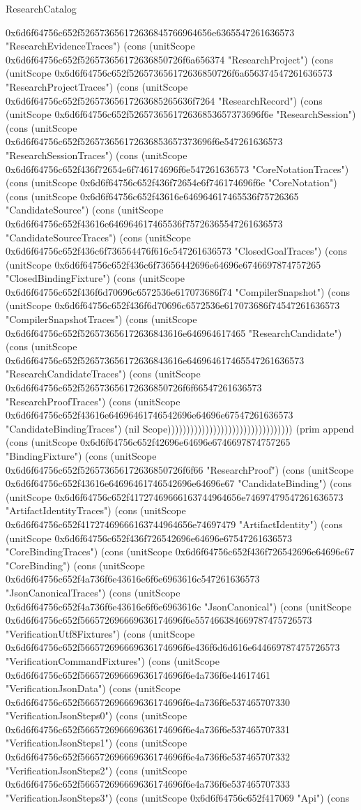 \begin{lexlean}{ResearchCatalog}
\begin{semanticmodule}
{0x6d6f64756c652f526573656172636845766964656e6365547261636573 "ResearchEvidenceTraces") (cons (unitScope 0x6d6f64756c652f526573656172636850726f6a656374 "ResearchProject") (cons (unitScope 0x6d6f64756c652f526573656172636850726f6a656374547261636573 "ResearchProjectTraces") (cons (unitScope 0x6d6f64756c652f52657365617263685265636f7264 "ResearchRecord") (cons (unitScope 0x6d6f64756c652f526573656172636853657373696f6e "ResearchSession") (cons (unitScope 0x6d6f64756c652f526573656172636853657373696f6e547261636573 "ResearchSessionTraces") (cons (unitScope 0x6d6f64756c652f436f72654e6f746174696f6e547261636573 "CoreNotationTraces") (cons (unitScope 0x6d6f64756c652f436f72654e6f746174696f6e "CoreNotation") (cons (unitScope 0x6d6f64756c652f43616e646964617465536f75726365 "CandidateSource") (cons (unitScope 0x6d6f64756c652f43616e646964617465536f75726365547261636573 "CandidateSourceTraces") (cons (unitScope 0x6d6f64756c652f436c6f736564476f616c547261636573 "ClosedGoalTraces") (cons (unitScope 0x6d6f64756c652f436c6f73656442696e64696e6746697874757265 "ClosedBindingFixture") (cons (unitScope 0x6d6f64756c652f436f6d70696c6572536e617073686f74 "CompilerSnapshot") (cons (unitScope 0x6d6f64756c652f436f6d70696c6572536e617073686f74547261636573 "CompilerSnapshotTraces") (cons (unitScope 0x6d6f64756c652f526573656172636843616e646964617465 "ResearchCandidate") (cons (unitScope 0x6d6f64756c652f526573656172636843616e646964617465547261636573 "ResearchCandidateTraces") (cons (unitScope 0x6d6f64756c652f526573656172636850726f6f66547261636573 "ResearchProofTraces") (cons (unitScope 0x6d6f64756c652f43616e64696461746542696e64696e67547261636573 "CandidateBindingTraces") (nil Scope))))))))))))))))))))))))))))))))) (prim append (cons (unitScope 0x6d6f64756c652f42696e64696e6746697874757265 "BindingFixture") (cons (unitScope 0x6d6f64756c652f526573656172636850726f6f66 "ResearchProof") (cons (unitScope 0x6d6f64756c652f43616e64696461746542696e64696e67 "CandidateBinding") (cons (unitScope 0x6d6f64756c652f41727469666163744964656e74697479547261636573 "ArtifactIdentityTraces") (cons (unitScope 0x6d6f64756c652f41727469666163744964656e74697479 "ArtifactIdentity") (cons (unitScope 0x6d6f64756c652f436f726542696e64696e67547261636573 "CoreBindingTraces") (cons (unitScope 0x6d6f64756c652f436f726542696e64696e67 "CoreBinding") (cons (unitScope 0x6d6f64756c652f4a736f6e43616e6f6e6963616c547261636573 "JsonCanonicalTraces") (cons (unitScope 0x6d6f64756c652f4a736f6e43616e6f6e6963616c "JsonCanonical") (cons (unitScope 0x6d6f64756c652f566572696669636174696f6e557466384669787475726573 "VerificationUtf8Fixtures") (cons (unitScope 0x6d6f64756c652f566572696669636174696f6e436f6d6d616e644669787475726573 "VerificationCommandFixtures") (cons (unitScope 0x6d6f64756c652f566572696669636174696f6e4a736f6e44617461 "VerificationJsonData") (cons (unitScope 0x6d6f64756c652f566572696669636174696f6e4a736f6e537465707330 "VerificationJsonSteps0") (cons (unitScope 0x6d6f64756c652f566572696669636174696f6e4a736f6e537465707331 "VerificationJsonSteps1") (cons (unitScope 0x6d6f64756c652f566572696669636174696f6e4a736f6e537465707332 "VerificationJsonSteps2") (cons (unitScope 0x6d6f64756c652f566572696669636174696f6e4a736f6e537465707333 "VerificationJsonSteps3") (cons (unitScope 0x6d6f64756c652f417069 "Api") (cons }
\end{semanticmodule}
\end{lexlean}

